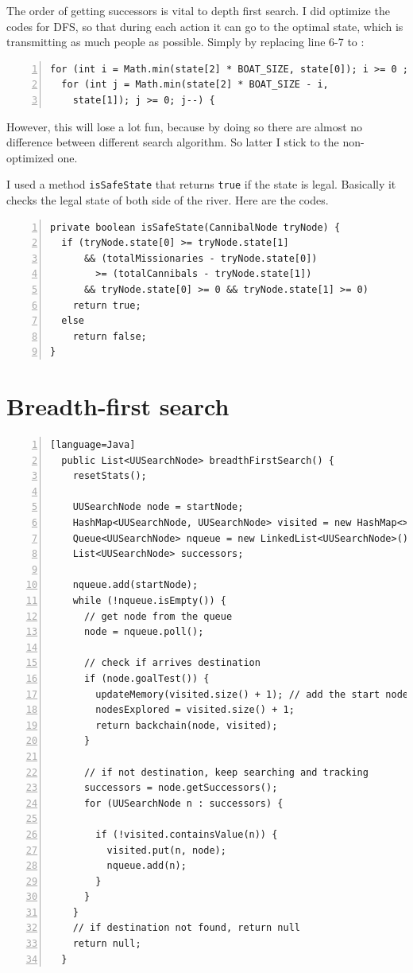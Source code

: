 \documentclass{article}
\begin{document}
The order of getting successors is vital to depth first search. I did optimize the codes for DFS, so that during each action it can go to the optimal state, which is transmitting as much people as possible. Simply by replacing line 6-7 to :

\begin{lstlisting}[numbers=left]
for (int i = Math.min(state[2] * BOAT_SIZE, state[0]); i >= 0 ; i--) {
  for (int j = Math.min(state[2] * BOAT_SIZE - i,
    state[1]); j >= 0; j--) {
\end{lstlisting}
However, this will lose a lot fun, because by doing so there are almost no difference between different search algorithm. So latter I stick to the non-optimized one.

I used a method \verb`isSafeState` that returns \verb`true` if the state is legal. Basically it checks the legal state of both side of the river. Here are the codes.

\begin{lstlisting}[numbers=left]
private boolean isSafeState(CannibalNode tryNode) {
  if (tryNode.state[0] >= tryNode.state[1]
      && (totalMissionaries - tryNode.state[0]) 
        >= (totalCannibals - tryNode.state[1])
      && tryNode.state[0] >= 0 && tryNode.state[1] >= 0)
    return true;
  else
    return false;
}
\end{lstlisting}

\section{Breadth-first search}


\begin{lstlisting}[numbers=left][language=Java]
  public List<UUSearchNode> breadthFirstSearch() {
    resetStats();

    UUSearchNode node = startNode;
    HashMap<UUSearchNode, UUSearchNode> visited = new HashMap<>();
    Queue<UUSearchNode> nqueue = new LinkedList<UUSearchNode>();
    List<UUSearchNode> successors;

    nqueue.add(startNode);
    while (!nqueue.isEmpty()) {
      // get node from the queue
      node = nqueue.poll();

      // check if arrives destination
      if (node.goalTest()) {
        updateMemory(visited.size() + 1); // add the start node
        nodesExplored = visited.size() + 1;
        return backchain(node, visited);
      }

      // if not destination, keep searching and tracking
      successors = node.getSuccessors();
      for (UUSearchNode n : successors) {

        if (!visited.containsValue(n)) {
          visited.put(n, node);
          nqueue.add(n);
        }
      }
    }
    // if destination not found, return null
    return null;
  }
\end{lstlisting}
\end{document}
